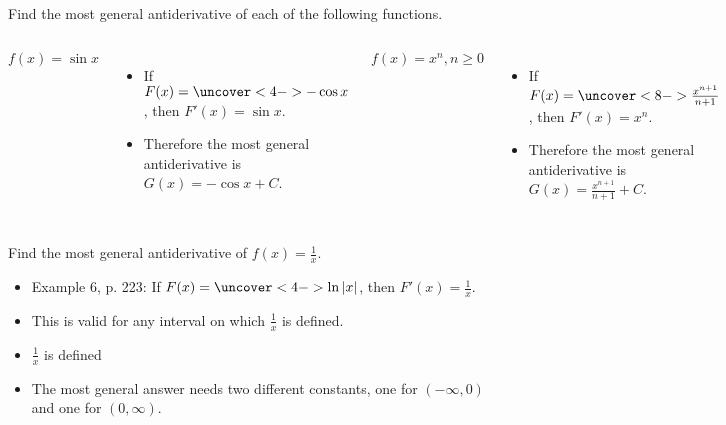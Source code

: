 \begin{frame}
\begin{example}[Example 1, p. 318]
Find the most general antiderivative of each of the following functions.
\begin{columns}[c]
\[
f(x) = \sin x%
\]
\begin{itemize}
\item<2->  If \alert<handout:0| 3-4>{$F(x) = \uncover<4->{-\cos x}$}, then $F'(x) = \sin x$.
\item<5->  Therefore the most general antiderivative is $G(x) = -\cos x + C$.
\end{itemize}
\[
f(x) = x^n, n\geq 0%
\]
\begin{itemize}
\item<6->  If \alert<handout:0| 7-8>{$F(x) = \uncover<8->{\frac{x^{n+1}}{n+1}}$}, then $F'(x) = x^n$.
\item<9->  Therefore the most general antiderivative is $G(x) = \frac{x^{n+1}}{n+1} + C$.
\end{itemize}
\end{columns}
\end{example}
\end{frame}


\begin{frame}
\begin{example}[Example 1b, p. 318]
Find the most general antiderivative of $\displaystyle f(x) = \frac{1}{x}$.%
\begin{itemize}
\item<2->  Example 6, p. 223: If \alert<handout:0| 3-4>{$F(x) = \uncover<4->{\ln |x|}$}, then $\displaystyle F'(x) = \frac{1}{x}$.
\item<5->  This is valid for any interval on which $\displaystyle \frac{1}{x}$ is defined.
\item<6-| alert@6-7>  $\displaystyle \frac{1}{x}$ is defined 
\item<8->  The most general answer needs two different constants, one for $(-\infty , 0)$ and one for $(0, \infty )$.
\end{itemize}
%
\end{example}
\end{frame}
